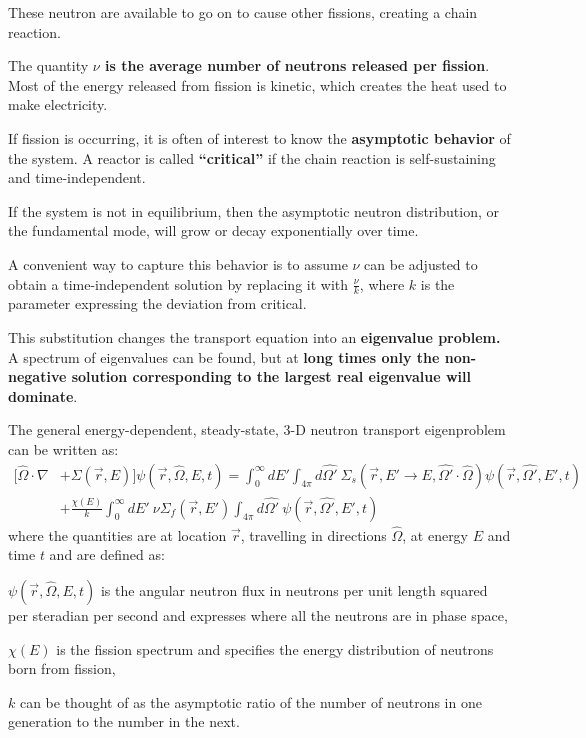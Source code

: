 \documentclass[12pt]{article}
\newcommand{\Macro}{\ensuremath{\Sigma}}
\begin{document}
These neutron are available to go on to cause other fissions, creating a chain reaction. 

The quantity \textbf{$\nu$ is the average number of neutrons released per fission}. Most of the energy released from fission is kinetic, which creates the heat used to make electricity.  

If fission is occurring, it is often of interest to know the \textbf{asymptotic behavior} of the system. A reactor is called \textbf{``critical''} if the chain reaction is self-sustaining and time-independent. 

If the system is not in equilibrium, then the asymptotic neutron distribution, or the fundamental mode, will grow or decay exponentially over time. 

A convenient way to capture this behavior is to assume $\nu$ can be adjusted to obtain a time-independent solution by replacing it with $\frac{\nu}{k}$, where $k$ is the parameter expressing the deviation from critical. 

This substitution changes the transport equation into an \textbf{eigenvalue problem.} A spectrum of eigenvalues can be found, but at \textbf{long times only the non-negative solution corresponding to the largest real eigenvalue will dominate}. 

The general energy-dependent, steady-state, 3-D neutron transport eigenproblem can be written as:
%
\begin{align}
[\hat{\Omega} \cdot \nabla &+ \Macro(\vec{r}, E)] \psi(\vec{r}, \hat{\Omega}, E, t)  =  \int_0^{\infty} dE' \int_{4\pi} d\hat{\Omega'} \:\Macro_{s}(\vec{r}, E' \to E, \hat{\Omega'} \cdot \hat{\Omega}) \psi(\vec{r}, \hat{\Omega'}, E', t) \nonumber \\
&+\frac{ \chi(E)}{k} \int_0^{\infty} dE' \:\nu \Macro_{f}(\vec{r}, E') \int_{4\pi} d\hat{\Omega'} \:\psi(\vec{r}, \hat{\Omega'}, E', t) \nonumber
\end{align}
%
\noindent where the quantities are at location $\vec{r}$, travelling in directions $\hat{\Omega}$, at energy $E$ and time $t$ and are defined as:
\begin{list}{}{\hspace{2em}}
  \item $\psi(\vec{r}, \hat{\Omega}, E, t)$ is the angular neutron flux in neutrons per unit length squared per steradian per second and expresses where all the neutrons are in phase space, 
  \item $\chi(E)$ is the fission spectrum and specifies the energy distribution of neutrons born from fission,
  \item $k$ can be thought of as the asymptotic ratio of the number of neutrons in one generation to the number in the next.
\end{list}
\end{document}
